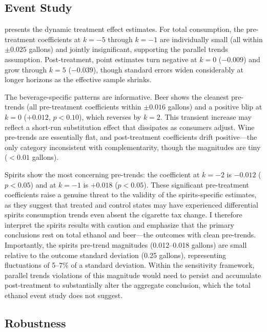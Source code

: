 \documentclass[12pt]{article}
\begin{document}



\subsection{Event Study}

 presents the dynamic treatment effect estimates. For total consumption, the pre-treatment coefficients at $k = -5$ through $k = -1$ are individually small (all within $\pm 0.025$ gallons) and jointly insignificant, supporting the parallel trends assumption. Post-treatment, point estimates turn negative at $k = 0$ ($-0.009$) and grow through $k = 5$ ($-0.039$), though standard errors widen considerably at longer horizons as the effective sample shrinks.

The beverage-specific patterns are informative. Beer shows the cleanest pre-trends (all pre-treatment coefficients within $\pm 0.016$ gallons) and a positive blip at $k = 0$ ($+0.012$, $p < 0.10$), which reverses by $k = 2$. This transient increase may reflect a short-run substitution effect that dissipates as consumers adjust. Wine pre-trends are essentially flat, and post-treatment coefficients drift positive---the only category inconsistent with complementarity, though the magnitudes are tiny ($< 0.01$ gallons).

Spirits show the most concerning pre-trends: the coefficient at $k = -2$ is $-0.012$ ($p < 0.05$) and at $k = -1$ is $+0.018$ ($p < 0.05$). These significant pre-treatment coefficients raise a genuine threat to the validity of the spirits-specific estimates, as they suggest that treated and control states may have experienced differential spirits consumption trends even absent the cigarette tax change. I therefore interpret the spirits results with caution and emphasize that the primary conclusions rest on total ethanol and beer---the outcomes with clean pre-trends. Importantly, the spirits pre-trend magnitudes (0.012--0.018 gallons) are small relative to the outcome standard deviation (0.25 gallons), representing fluctuations of 5--7\% of a standard deviation. Within the \citet{rambachan2023more} sensitivity framework, parallel trends violations of this magnitude would need to persist and accumulate post-treatment to substantially alter the aggregate conclusion, which the total ethanol event study does not suggest.




\subsection{Robustness}
\end{document}
